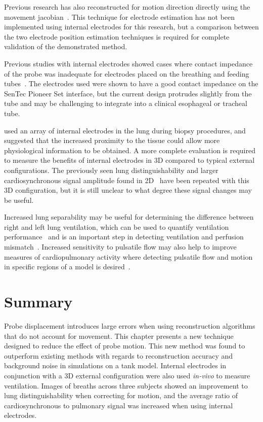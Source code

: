 Previous research has also 
reconstructed for motion direction directly using the movement
jacobian~\parencite{boyle_geophysical_2016,gomez-laberge_direct_2008,soleimani_imaging_2006}.
This technique for electrode estimation has not been implemented using internal electrodes 
for this research, but a comparison between the two electrode position estimation techniques 
is required for complete validation of the demonstrated method.

Previous studies with internal electrodes showed cases where contact impedance of the probe
was inadequate for electrodes
placed on the breathing and feeding tubes~\parencite{czaplik_application_2014}.
The electrodes used were shown to have a good contact impedance on the SenTec Pioneer
Set interface, but the current design protrudes slightly from the tube and may be challenging to 
integrate into a clinical esophageal or tracheal tube.

 used an array of internal electrodes in the lung 
during biopsy procedures, and suggested that the increased proximity to the 
tissue could allow more physiological information to be obtained. A more complete 
evaluation is required to measure the benefits of internal electrodes in 3D compared 
to typical external configurations. The previously seen lung distinguishability
and larger cardiosynchronous signal amplitude found in 2D~\parencite{czaplik_application_2014} 
have been repeated with this 3D configuration, but it is still unclear to what 
degree these signal changes may be useful. 

Increased lung separability may be useful for determining the difference between right 
and left lung ventilation, which can be used to quantify ventilation 
performance~\parencite{sage_assessing_2018}
and is an important step in detecting ventilation and perfusion
mismatch~\parencite{stowe_comparison_2019,kircher_regional_2021,leonhardt_electrical_2012}.
Increased sensitivity to pulsatile flow may also help to improve measures
of cardiopulmonary activity where detecting pulsatile flow 
and motion in specific regions of a model is 
desired~\parencite{braun_accuracy_2018,proenca_non-invasive_2020}.

\section{Summary}
Probe displacement introduces large errors when using 
reconstruction algorithms that do not account for movement. This chapter presents
a new technique designed to reduce the effect of probe motion.
This new method 
was found to outperform existing methods with regards to reconstruction 
accuracy and background noise in simulations on a tank model. 
Internal electrodes in conjunction with a 3D external configuration were also 
used \emph{in-vivo} to measure ventilation. 
Images of breaths across three subjects showed an improvement to lung distinguishability
when correcting for motion, and the average ratio of cardiosynchronous
to pulmonary signal was increased when using internal electrodes. 